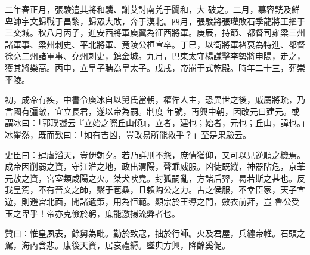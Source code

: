 \begin{pinyinscope}
 二年春正月，張駿遣其將和驎、謝艾討南羌于闐和，大
 破之。二月，慕容皝及鮮卑帥宇文歸戰于昌黎，歸眾大敗，奔于漠北。四月，張駿將張瓘敗石季龍將王擢于三交城。秋八月丙子，進安西將軍庾翼為征西將軍。庚辰，持節、都督司雍梁三州諸軍事、梁州刺史、平北將軍、竟陵公桓宣卒。丁巳，以衛將軍褚裒為特進、都督徐兗二州諸軍事、兗州刺史，鎮金城。九月，巴東太守楊謙擊李勢將申陽，走之，獲其將樂高。丙申，立皇子聃為皇太子。戊戌，帝崩于式乾殿。時年二十三，葬崇平陵。



 初，成帝有疾，中書令庾冰自以舅氏當朝，權侔人主，恐異世之後，戚屬將疏，乃言國有彊敵，宜立長君，遂以帝為嗣。制度
 年號，再興中朝，因改元曰建元。或謂冰曰：「郭璞讖云『立始之際丘山傾』，立者，建也；始者，元也；丘山，諱也。」冰瞿然，既而歎曰：「如有吉凶，豈改易所能救乎？」至是果驗云。



 史臣曰：肆虐滔天，豈伊朝夕。若乃詳刑不怨，庶情猶仰，又可以見逆順之機焉。成帝因削弱之資，守江淮之地，政出渭陽，聲乖威服。凶徒既縱，神器阽危，京華元敖之資，宮室類咸陽之火。桀犬吠堯。封狐嗣亂，方諸后羿，曷若斯之甚也。反我皇駕，不有晉文之師，繫于苞桑，且賴陶公之力。古之侯服，不幸臣家，天子宣遊，則避宮北面，聞諸遺策，用為恒範。顯宗於王導之門，斂衣前拜，豈
 魯公受玉之卑乎！帝亦克儉於躬，庶能激揚流弊者也。



 贊曰：惟皇夙表，餘舅為毗。勤於致寇，拙於行師。火及君屋，兵纏帝帷。石頭之駕，海內含悲。康後天資，居哀禮縟。墜典方興，降齡奚促。



\end{pinyinscope}